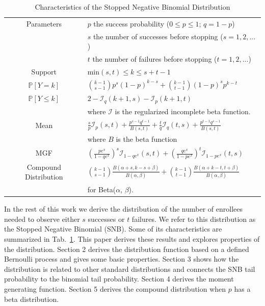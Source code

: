 \documentclass[review]{elsarticle}
\begin{document}
\begin{table}[t!]
\caption{Characteristics of the Stopped Negative Binomial Distribution}
\label{tab:snb}
\begin{center}
\begin{tabular}{|c|l|} \hline
Parameters & $p$ the success probability ($0\leq p \leq 1$; $q = 1-p$) \\
           & $s$ the number of successes before stopping ($s=1, 2, ...$)\\
           & $t$ the number of failures before stopping ($t=1, 2, ...$)\\ \hline
Support & min$(s,t) \leq k \leq s+t-1$  \\ \hline
$\mathbb{P}[Y=k]$ & ${k-1 \choose s-1} p^s (1-p)^{k-s} + {k-1 \choose t-1} (1-p)^s p^{k-t}$\\ \hline
$\mathbb{P}[Y \leq k]$ & $2 - \mathcal{I}_{q}(k+1, s) - \mathcal{I}_{p}(k+1, t)$\\ 
    & where $\mathcal{I}$ is the regularized incomplete beta function.\\ \hline
Mean & $\frac{s}{p} \mathcal{I}_p(s,t) + \frac{p^{s-1} q^{t-1}}{B(s,t)} +
  \frac{t}{q} \mathcal{I}_q(t,s) + \frac{p^{t-1} q^{s-1}}{B(s,t)}$\\ 
  & where $B$ is the beta function \\ \hline
MGF & $\left(\frac{p e^x}{1 - qe^x}\right)^s 
  \mathcal{I}_{1-qe^x} (s, t) + \left(\frac{qe^x}{1-pe^x}\right)^t 
  \mathcal{I}_{1-pe^x}(t, s) $\\ \hline
Compound Distribution & 
${k-1 \choose s-1} \frac{B\left(\alpha+s, k-s+\beta \right)}{B(\alpha, \beta)}+
{k-1 \choose t-1} \frac{B\left(\alpha + k-t, t+\beta\right)}{B(\alpha,\beta)}$\\
& for Beta($\alpha$, $\beta$). \\ \hline
\end{tabular}
\end{center}
\end{table}

In the rest of this work we derive the distribution of the number of 
enrollees needed
to observe either $s$ successes or $t$ failures. We refer to this distribution
as the Stopped Negative Binomial (SNB). Some of its characteristics are
summarized in Tab.~\ref{tab:snb}.
This paper derives these results
and explores properties of the distribution.
Section 2 derives the distribution function
based on a defined Bernoulli process and gives some basic properties.
Section 3 shows how the distribution is related to other standard
distributions and connects the SNB tail probability to the binomial tail 
probability.
Section 4 derives the moment generating function.
Section 5 derives the compound distribution when $p$ has a beta distribution.
\end{document}
